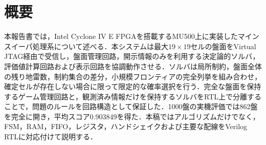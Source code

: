 \chapter*{概要}
本報告書では，Intel Cyclone IV E FPGAを搭載するMU500上に実装したマインスイーパ処理系について述べる．本システムは最大$19\times19$セルの盤面をVirtual JTAG経由で受信し，盤面管理回路，開示情報のみを利用する決定論的ソルバ，評価値計算回路および表示回路を協調動作させる．ソルバは局所制約，盤面全体の残り地雷数，制約集合の差分，小規模フロンティアの完全列挙を組み合わせ，確定セルが存在しない場合に限って限定的な確率選択を行う．完全な盤面を保持するゲーム管理回路と，観測済み情報だけを保持するソルバをRTL上で分離することで，問題のルールを回路構造として保証した．1000盤の実機評価では862盤を完全に開き，平均スコア0.903849を得た．本稿ではアルゴリズムだけでなく，FSM，RAM，FIFO，レジスタ，ハンドシェイクおよび主要な配線をVerilog RTLに対応付けて説明する．
